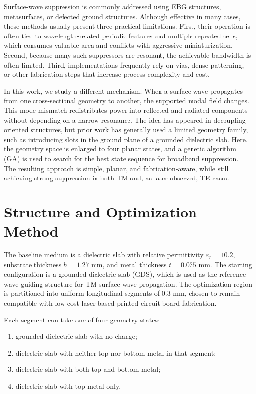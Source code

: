 \documentclass[journal]{IEEEtran}
\begin{document}
Surface-wave suppression is commonly addressed using EBG structures, metasurfaces, or defected ground structures. Although effective in many cases, these methods usually present three practical limitations. First, their operation is often tied to wavelength-related periodic features and multiple repeated cells, which consumes valuable area and conflicts with aggressive miniaturization. Second, because many such suppressors are resonant, the achievable bandwidth is often limited. Third, implementations frequently rely on vias, dense patterning, or other fabrication steps that increase process complexity and cost.

In this work, we study a different mechanism. When a surface wave propagates from one cross-sectional geometry to another, the supported modal field changes. This mode mismatch redistributes power into reflected and radiated components without depending on a narrow resonance. The idea has appeared in decoupling-oriented structures, but prior work has generally used a limited geometry family, such as introducing slots in the ground plane of a grounded dielectric slab. Here, the geometry space is enlarged to four planar states, and a genetic algorithm (GA) is used to search for the best state sequence for broadband suppression. The resulting approach is simple, planar, and fabrication-aware, while still achieving strong suppression in both TM and, as later observed, TE cases.

\section{Structure and Optimization Method}
The baseline medium is a dielectric slab with relative permittivity $\varepsilon_r=10.2$, substrate thickness $h=1.27$ mm, and metal thickness $t=0.035$ mm. The starting configuration is a grounded dielectric slab (GDS), which is used as the reference wave-guiding structure for TM surface-wave propagation. The optimization region is partitioned into uniform longitudinal segments of 0.3 mm, chosen to remain compatible with low-cost laser-based printed-circuit-board fabrication.

Each segment can take one of four geometry states:
\begin{enumerate}
\item grounded dielectric slab with no change;
\item dielectric slab with neither top nor bottom metal in that segment;
\item dielectric slab with both top and bottom metal;
\item dielectric slab with top metal only.
\end{enumerate}
\end{document}
